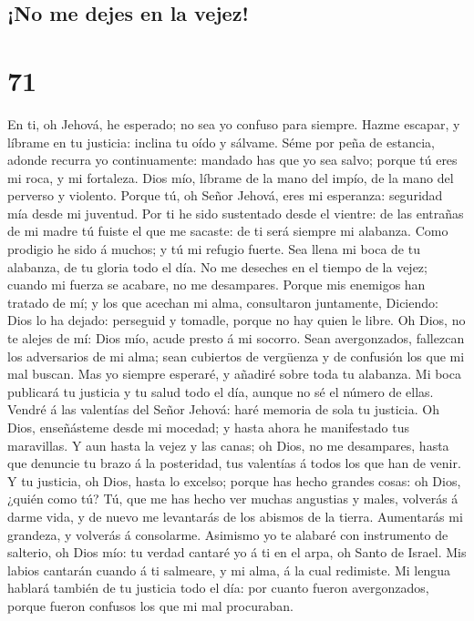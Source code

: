 \hypertarget{no-me-dejes-en-la-vejez}{%
\subsection{¡No me dejes en la vejez!}\label{no-me-dejes-en-la-vejez}}

\hypertarget{section-70}{%
\section{71}\label{section-70}}

 En ti, oh Jehová, he esperado; no sea yo confuso para
siempre.  Hazme escapar, y líbrame en tu justicia: inclina
tu oído y sálvame.  Séme por peña de estancia, adonde
recurra yo continuamente: mandado has que yo sea salvo; porque tú eres
mi roca, y mi fortaleza.  Dios mío, líbrame de la mano del
impío, de la mano del perverso y violento.  Porque tú, oh
Señor Jehová, eres mi esperanza: seguridad mía desde mi juventud.
 Por ti he sido sustentado desde el vientre: de las
entrañas de mi madre tú fuiste el que me sacaste: de ti será siempre mi
alabanza.  Como prodigio he sido á muchos; y tú mi refugio
fuerte.  Sea llena mi boca de tu alabanza, de tu gloria
todo el día.  No me deseches en el tiempo de la vejez;
cuando mi fuerza se acabare, no me desampares.  Porque
mis enemigos han tratado de mí; y los que acechan mi alma, consultaron
juntamente,  Diciendo: Dios lo ha dejado: perseguid y
tomadle, porque no hay quien le libre.  Oh Dios, no te
alejes de mí: Dios mío, acude presto á mi socorro.  Sean
avergonzados, fallezcan los adversarios de mi alma; sean cubiertos de
vergüenza y de confusión los que mi mal buscan.  Mas yo
siempre esperaré, y añadiré sobre toda tu alabanza.  Mi
boca publicará tu justicia y tu salud todo el día, aunque no sé el
número de ellas.  Vendré á las valentías del Señor
Jehová: haré memoria de sola tu justicia.  Oh Dios,
enseñásteme desde mi mocedad; y hasta ahora he manifestado tus
maravillas.  Y aun hasta la vejez y las canas; oh Dios,
no me desampares, hasta que denuncie tu brazo á la posteridad, tus
valentías á todos los que han de venir.  Y tu justicia,
oh Dios, hasta lo excelso; porque has hecho grandes cosas: oh Dios,
¿quién como tú?  Tú, que me has hecho ver muchas
angustias y males, volverás á darme vida, y de nuevo me levantarás de
los abismos de la tierra.  Aumentarás mi grandeza, y
volverás á consolarme.  Asimismo yo te alabaré con
instrumento de salterio, oh Dios mío: tu verdad cantaré yo á ti en el
arpa, oh Santo de Israel.  Mis labios cantarán cuando á
ti salmeare, y mi alma, á la cual redimiste.  Mi lengua
hablará también de tu justicia todo el día: por cuanto fueron
avergonzados, porque fueron confusos los que mi mal procuraban.

